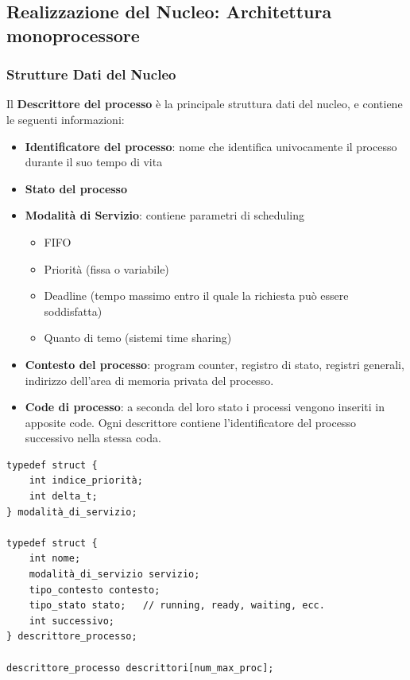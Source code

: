 \documentclass{article}
\begin{document}
\subsection{Realizzazione del Nucleo: Architettura monoprocessore}

\subsubsection{Strutture Dati del Nucleo}

Il \textbf{Descrittore del processo} è la principale struttura dati del nucleo, e contiene le seguenti informazioni:
\begin{itemize}
    \item \textbf{Identificatore del processo}: nome che identifica univocamente il processo durante il suo tempo di vita
    \item \textbf{Stato del processo}
    \item \textbf{Modalità di Servizio}: contiene parametri di scheduling
    \begin{itemize}
        \item FIFO
        \item Priorità (fissa o variabile)
        \item Deadline (tempo massimo entro il quale la richiesta può essere soddisfatta)
        \item Quanto di temo (sistemi time sharing)
    \end{itemize}
    \item \textbf{Contesto del processo}: program counter, registro di stato, registri generali, indirizzo dell'area di memoria privata del processo.
    \item \textbf{Code di processo}: a seconda del loro stato i processi vengono inseriti in apposite code. Ogni descrittore contiene l'identificatore del processo successivo 
    nella stessa coda.
\end{itemize}

\begin{lstlisting}[caption={Realizzazione desctittore del processo},captionpos=b]
typedef struct {
    int indice_priorità;
    int delta_t;
} modalità_di_servizio;

typedef struct {
    int nome;
    modalità_di_servizio servizio;
    tipo_contesto contesto;
    tipo_stato stato;   // running, ready, waiting, ecc.
    int successivo;
} descrittore_processo;

descrittore_processo descrittori[num_max_proc];
\end{lstlisting}
\end{document}
